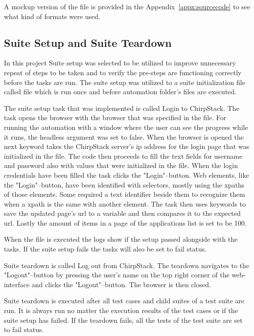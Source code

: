 A mockup version of the file is provided in the Appendix~\ref{appx:sourcecode} to see what kind of formats were used.

\subsection{Suite Setup and Suite Teardown}

In this project Suite setup was selected to be utilized to improve unnecessary repeat of steps to be taken and to verify the pre-steps are functioning correctly before the tasks are run.
The suite setup was utilized to a suite initialization file called  file which is run once and before automation folder's files are executed.

The suite setup task that was implemented is called Login to ChirpStack.
The task opens the browser with the browser that was specified in the  file.
For running the automation with a window where the user can see the progress while it runs, the headless argument was set to false.
When the browser is opened the next keyword takes the ChirpStack server's \gls{ip} address for the login page that was initialized in the  file.
The code then proceeds to fill the text fields for username and password also with values that were initialized in the  file.
When the login credentials have been filled the task clicks the "Login"--button.
Web elements, like the "Login"--button, have been identified with selectors, mostly using the xpaths of those elements.
Some required a text identifier beside them to recognize them when a xpath is the same with another element.
The task then uses keywords to save the updated page's \gls{url} to a variable and then compares it to the expected \gls{url}.
Lastly the amount of items in a page of the applications list is set to be 100.

When the  file is executed the logs show if the setup passed alongside with the tasks.
If the suite setup fails the tasks will also be set to fail status\cite{robotFrameworkUserGuide:suiteSetupAndTeardown}.

Suite teardown is called Log out from ChirpStack.
The teardown navigates to the "Logout"--button by pressing the user's name on the top right corner of the web-interface and clicks the "Logout"--button.
The browser is then closed.

Suite teardown is executed after all test cases and child suites of a test suite are run.
It is always run no matter the execution results of the test cases or if the suite setup has failed.
If the teardown fails, all the tests of the test suite are set to fail status\cite{robotFrameworkUserGuide:suiteSetupAndTeardown}.

